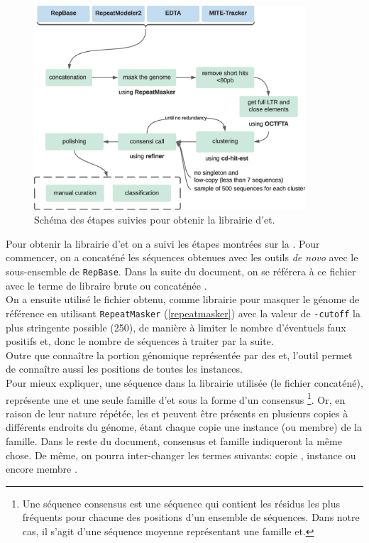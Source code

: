\documentclass[10pt]{article}
\begin{document}
\bigskip

\begin{figure}[h]    
    \centering
    \includegraphics[width=0.9\textwidth]{img/misc/lib_construction.eps}
    \caption{Schéma des étapes suivies pour obtenir la librairie d'\acrshort{et}.}
    \label{fig:pipeline_lib}
\end{figure}

\bigskip

Pour obtenir la librairie d'\acrlong{et} on a suivi les étapes montrées sur la \figureautorefname{ \ref{fig:pipeline_lib}}. Pour commencer, on a concaténé les séquences obtenues avec les outils \textit{de novo} avec le sous-ensemble de \texttt{RepBase}. Dans la suite du document, on se référera à ce fichier avec le terme de libraire \og brute \fg{} ou \og concaténée \fg{}.\\
On a ensuite utilisé le fichier obtenu, comme librairie pour masquer le génome de référence en utilisant \texttt{RepeatMasker} \cite{noauthor_repeatmasker_nodate} (\autoref{repeatmasker}) avec la valeur de \texttt{-cutoff} la plus stringente possible (250), de manière à limiter le nombre d'éventuels faux positifs et, donc le nombre de séquences à traiter par la suite. \\
Outre que connaître la portion génomique représentée par des \acrshort{et}, l'outil permet de connaître aussi les positions de toutes les instances. \\
Pour mieux expliquer, une séquence dans la librairie utilisée (le fichier concaténé), représente une et une seule famille d'\acrshort{et} sous la forme d'un consensus
\footnote{
Une séquence consensus est une séquence qui contient les résidus les plus fréquents pour chacune des positions d'un ensemble de séquences. Dans notre cas, il s'agit d'une séquence \og moyenne \fg{} représentant une famille \acrshort{et}.
}. Or, en raison de leur nature répétée, les \acrshort{et} peuvent être présents en plusieurs copies à différents endroits du génome, étant chaque copie une instance (ou membre) de la famille. Dans le reste du document, \og consensus \fg{} et \og famille \fg{} indiqueront la même chose. De même, on pourra inter-changer les termes suivants: \og copie \fg{}, \og instance \fg{} ou encore \og membre \fg{}.\\ 
\end{document}
